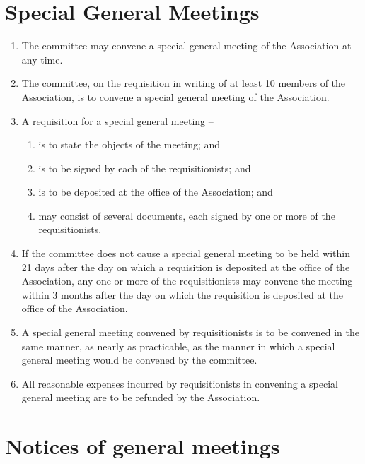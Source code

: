\documentclass[a4paper,11pt]{article}
\begin{document}
\section{Special General Meetings}
\label{rule:sgm}

\begin{enumerate}
	\item The committee may convene a special general meeting of the Association at any time.
	\item The committee, on the requisition in writing of at least 10 members of the Association, is to convene a special general meeting of the Association.
	
	\item A requisition for a special general meeting --
	\begin{enumerate}
		\item is to state the objects of the meeting; and
		\item is to be signed by each of the requisitionists; and
		\item is to be deposited at the office of the Association; and
		\item may consist of several documents, each signed by one or more of the requisitionists.
	\end{enumerate}
	
	\item If the committee does not cause a special general meeting to be held within 21 days after the day on which a requisition is deposited at the office of the Association, any one or more of the requisitionists may convene the meeting within 3 months after the day on which the requisition is deposited at the office of the Association.
	\item A special general meeting convened by requisitionists is to be convened in the same manner, as nearly as practicable, as the manner in which a special general meeting would be convened by the committee.
	\item All reasonable expenses incurred by requisitionists in convening a special general meeting are to be refunded by the Association.
\end{enumerate}

\section{Notices of general meetings}
\label{rule:meetings}
\end{document}
